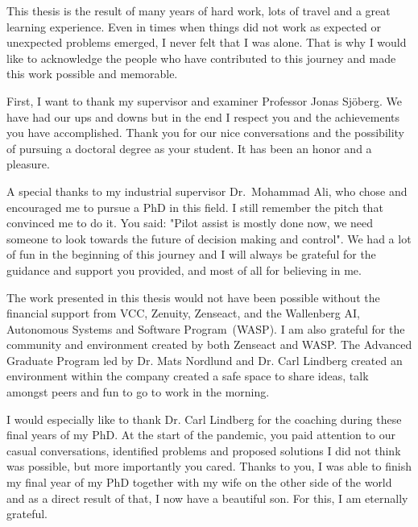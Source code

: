 



This thesis is the result of many years of hard work, lots of travel and a great learning experience. Even in times when things did not work as expected or unexpected problems emerged, I never felt that I was alone. That is why I would like to acknowledge the people who have contributed to this journey and made this work possible and memorable. 

First, I want to thank my supervisor and examiner Professor Jonas Sj\"oberg. We have had our ups and downs but in the end I respect you and the achievements you have accomplished. Thank you for our nice conversations and the possibility of pursuing a doctoral degree as your student. It has been an honor and a pleasure.

A special thanks to my industrial supervisor Dr.~Mohammad Ali, who chose and encouraged me to pursue a PhD in this field. I still remember the pitch that convinced me to do it. You said: "Pilot assist is mostly done now, we need someone to look towards the future of decision making and control". We had a lot of fun in the beginning of this journey and I will always be grateful for the guidance and support you provided, and most of all for believing in me. 

The work presented in this thesis would not have been possible without the financial support from VCC, Zenuity, Zenseact, and the Wallenberg AI, Autonomous Systems and Software Program~(WASP). I am also grateful for the community and environment created by both Zenseact and WASP. The Advanced Graduate Program led by Dr. Mats Nordlund and Dr. Carl Lindberg created an environment within the company created a safe space to share ideas, talk amongst peers and fun to go to work in the morning. 

I would especially like to thank Dr. Carl Lindberg for the coaching during these final years of my PhD. At the start of the pandemic, you paid attention to our casual conversations, identified problems and proposed solutions I did not think was possible, but more importantly you cared. Thanks to you, I was able to finish my final year of my PhD together with my wife on the other side of the world and as a direct result of that, I now have a beautiful son. For this, I am eternally grateful. 
 
